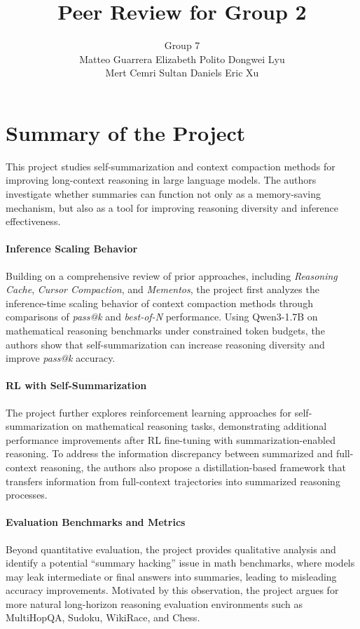 \documentclass{article}
\author{}
\date{}
\title{Peer Review for Group 2}
\author{
Group 7 \\ Matteo Guarrera \quad Elizabeth Polito \quad Dongwei Lyu \\ Mert Cemri \quad Sultan Daniels \quad Eric Xu
}
\begin{document}
\maketitle
\author{}
% 
\vspace{-0.5cm}

\vspace{-0.3cm}

\section{Summary of the Project}

This project studies self-summarization and context compaction methods for improving long-context reasoning in large language models. The authors investigate whether summaries can function not only as a memory-saving mechanism, but also as a tool for improving reasoning diversity and inference effectiveness.

\paragraph{Inference Scaling Behavior} Building on a comprehensive review of prior approaches, including \textit{Reasoning Cache}, \textit{Cursor Compaction}, and \textit{Mementos}, the project first analyzes the inference-time scaling behavior of context compaction methods through comparisons of \textit{pass@k} and \textit{best-of-N} performance. Using Qwen3-1.7B on mathematical reasoning benchmarks under constrained token budgets, the authors show that self-summarization can increase reasoning diversity and improve \textit{pass@k} accuracy.

\paragraph{RL with Self-Summarization}  The project further explores reinforcement learning approaches for self-summarization on mathematical reasoning tasks, demonstrating additional performance improvements after RL fine-tuning with summarization-enabled reasoning. To address the information discrepancy between summarized and full-context reasoning, the authors also propose a distillation-based framework that transfers information from full-context trajectories into summarized reasoning processes.

\paragraph{Evaluation Benchmarks and Metrics} Beyond quantitative evaluation, the project provides qualitative analysis and identify a potential “summary hacking” issue in math benchmarks, where models may leak intermediate or final answers into summaries, leading to misleading accuracy improvements. Motivated by this observation, the project argues for more natural long-horizon reasoning evaluation environments such as MultiHopQA, Sudoku, WikiRace, and Chess.
\end{document}
